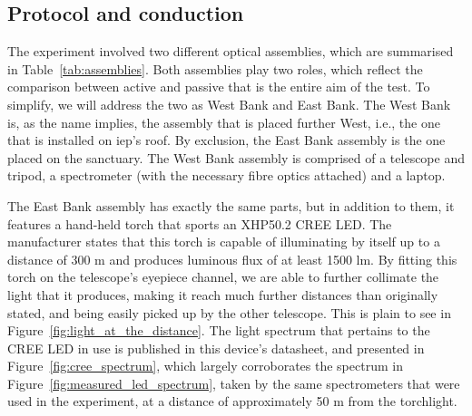 \subsection{Protocol and conduction}%
\label{sub:protocol_and_conduction}

The experiment involved two different optical assemblies, which are
summarised in Table~\ref{tab:assemblies}. Both assemblies play two
roles, which reflect the comparison between active and passive that is
the entire aim of the test. To simplify, we will address the two as West
Bank and East Bank. The West Bank is, as the name implies, the assembly
that is placed further West, i.e., the one that is installed on
\gls{iep}'s roof. By exclusion, the East Bank assembly is the one placed
on the sanctuary. The West Bank assembly is comprised of a telescope and
tripod, a spectrometer (with the necessary fibre optics attached) and a
laptop. 

The East Bank assembly has exactly the same parts, but in addition to
them, it features a hand-held torch that sports an XHP50.2 CREE LED. The
manufacturer states that this torch is capable of illuminating by itself
up to a distance of 300 m and produces luminous flux of at least 1500
lm. By fitting this torch on the telescope's eyepiece channel, we are
able to further collimate the light that it produces, making it reach
much further distances than originally stated, and being easily picked
up by the other telescope. This is plain to see in
Figure~\ref{fig:light_at_the_distance}. The light spectrum that pertains
to the CREE LED in use is published in this device's datasheet, and
presented in Figure~\ref{fig:cree_spectrum}, which largely corroborates
the spectrum in Figure~\ref{fig:measured_led_spectrum}, taken by the
same spectrometers that were used in the experiment, at a distance of
approximately 50 m from the torchlight. 

